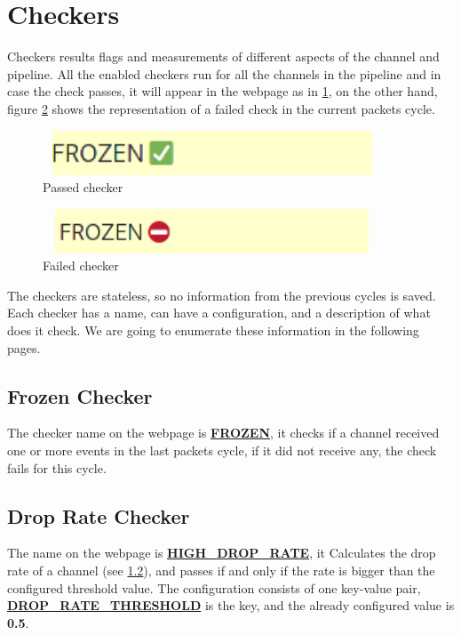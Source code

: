 \section{Checkers}\label{sec:checkers}
Checkers results flags and measurements of different aspects of the channel and pipeline. All 
the enabled checkers run for all the channels in the pipeline and in case the check passes, it will appear
in the webpage as in \ref{fig:passed_checker}, on the other hand, figure \ref{fig:failed_checker} shows 
the representation of a failed check in the current packets cycle.
\newline
\begin{figure}[H]
	\centering
	\includegraphics[width=0.9\textwidth,height=50px]{images/passed_checker.png}
	\caption{Passed checker}
	\label{fig:passed_checker}
\end{figure}

\begin{figure}[H]
	\centering
	\includegraphics[width=0.9\textwidth,height=50px]{images/failed_checker.png}
	\caption{Failed checker}
	\label{fig:failed_checker}
\end{figure}
The checkers are stateless, so no information from the previous cycles is saved. Each checker has a name, 
can have a configuration, and a description of what does it check. We are going to enumerate these information
in the following pages.

\subsection{Frozen Checker}
The checker name on the webpage is \textbf{\url{FROZEN}}, it checks if a channel received one or more events in the last packets cycle, 
if it did not receive any, the check fails for this cycle.

\subsection{Drop Rate Checker}
The name on the webpage is \textbf{\url{HIGH_DROP_RATE}}, it Calculates the drop rate of 
a channel (see \ref{}), and passes if and only if the rate is bigger than the configured threshold value. The
configuration consists of one key-value pair, \textbf{\url{DROP_RATE_THRESHOLD}} is the key, and the already configured
value is \textbf{0.5}.

